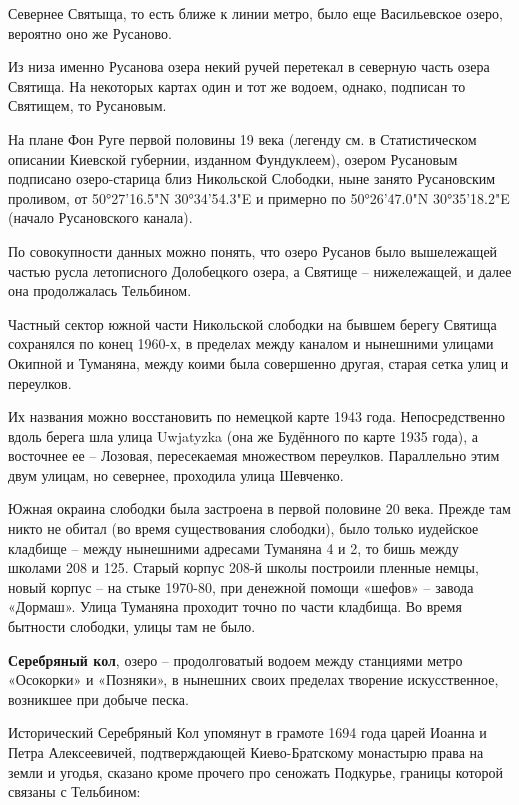 Севернее Святыща, то есть ближе к линии метро, было еще Васильевское озеро, вероятно оно же Русаново.

Из низа именно Русанова озера некий ручей перетекал в северную часть озера Святища. На некоторых картах один и тот же водоем, однако, подписан то Святищем, то Русановым.

На плане Фон Руге первой половины 19 века (легенду см. в Статистическом описании Киевской губернии, изданном Фундуклеем), озером Русановым подписано озеро-старица близ Никольской Слободки, ныне занято Русановским проливом, от 50°27'16.5"N 30°34'54.3"E и примерно по 50°26'47.0"N 30°35'18.2"E (начало Русановского канала). 

По совокупности данных можно понять, что озеро Русанов было вышележащей частью русла летописного Долобецкого озера, а Святище – нижележащей, и далее она продолжалась Тельбином.

Частный сектор южной части Никольской слободки на бывшем берегу Святища сохранялся по конец 1960-х, в пределах между каналом и нынешними улицами Окипной и Туманяна, между коими была совершенно другая, старая сетка улиц и переулков.

Их названия можно восстановить по немецкой карте 1943 года. Непосредственно вдоль берега шла улица Uwjatyzka (она же Будённого по карте 1935 года), а восточнее ее – Лозовая, пересекаемая множеством переулков. Параллельно этим двум улицам, но севернее, проходила улица Шевченко.

Южная окраина слободки была застроена в первой половине 20 века. Прежде там никто не обитал (во время существования слободки), было только иудейское кладбище – между нынешними адресами Туманяна 4 и 2, то бишь между школами 208 и 125. Старый корпус 208-й школы построили пленные немцы, новый корпус – на стыке 1970-80, при денежной помощи «шефов» – завода «Дормаш». Улица Туманяна проходит точно по части кладбища. Во время бытности слободки, улицы там не было.\\

\medskip

\textbf{Серебряный кол}, озеро – продолговатый водоем между станциями метро «Осокорки» и «Позняки», в нынешних своих пределах творение искусственное, возникшее при добыче песка.

Исторический Серебряный Кол упомянут в грамоте 1694 года царей Иоанна и Петра Алексеевичей, подтверждающей Киево-Братскому монастырю права на земли и угодья, сказано кроме прочего про сеножать Подкурье, границы которой связаны с Тельбином:

